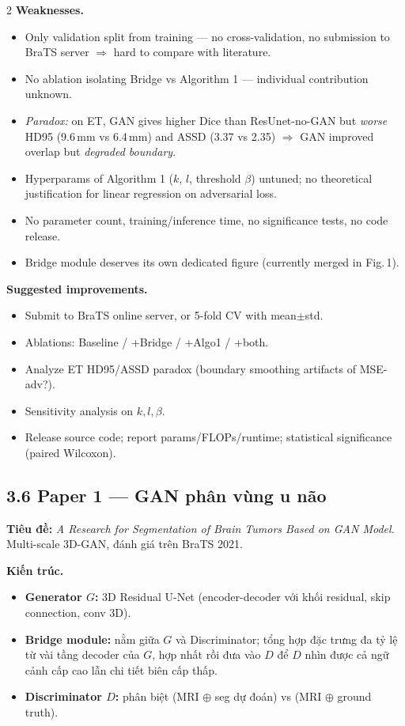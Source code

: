 \begin{paracol}{2}
\textbf{Weaknesses.}
\begin{itemize}[leftmargin=*,nosep]
  \item Only validation split from training — no cross-validation, no submission to BraTS server $\Rightarrow$ hard to compare with literature.
  \item No ablation isolating Bridge vs Algorithm 1 — individual contribution unknown.
  \item \emph{Paradox:} on ET, GAN gives higher Dice than ResUnet-no-GAN but \emph{worse} HD95 (9.6\,mm vs 6.4\,mm) and ASSD (3.37 vs 2.35) $\Rightarrow$ GAN improved overlap but \emph{degraded boundary}.
  \item Hyperparams of Algorithm 1 ($k$, $l$, threshold $\beta$) untuned; no theoretical justification for linear regression on adversarial loss.
  \item No parameter count, training/inference time, no significance tests, no code release.
  \item Bridge module deserves its own dedicated figure (currently merged in Fig.\,1).
\end{itemize}

\textbf{Suggested improvements.}
\begin{itemize}[leftmargin=*,nosep]
  \item Submit to BraTS online server, or 5-fold CV with mean$\pm$std.
  \item Ablations: Baseline / +Bridge / +Algo1 / +both.
  \item Analyze ET HD95/ASSD paradox (boundary smoothing artifacts of MSE-adv?).
  \item Sensitivity analysis on $k,l,\beta$.
  \item Release source code; report params/FLOPs/runtime; statistical significance (paired Wilcoxon).
\end{itemize}

\switchcolumn

\subsection*{3.6 Paper 1 — GAN phân vùng u não}
\textbf{Tiêu đề:} \emph{A Research for Segmentation of Brain Tumors Based on GAN Model.} Multi-scale 3D-GAN, đánh giá trên BraTS 2021.

\textbf{Kiến trúc.}
\begin{itemize}[leftmargin=*,nosep]
  \item \textbf{Generator $G$:} 3D Residual U-Net (encoder-decoder với khối residual, skip connection, conv 3D).
  \item \textbf{Bridge module:} nằm giữa $G$ và Discriminator; tổng hợp đặc trưng đa tỷ lệ từ vài tầng decoder của $G$, hợp nhất rồi đưa vào $D$ để $D$ nhìn được cả ngữ cảnh cấp cao lẫn chi tiết biên cấp thấp.
  \item \textbf{Discriminator $D$:} phân biệt (MRI $\oplus$ seg dự đoán) vs (MRI $\oplus$ ground truth).
\end{itemize}


\end{paracol}
